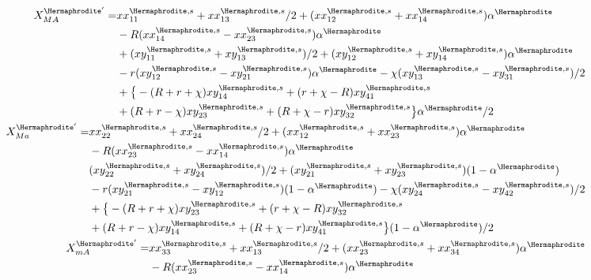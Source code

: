 \documentclass[12pt]{article}
\begin{document}
\begingroup
\allowdisplaybreaks
\begin{subequations}
\begin{align}
%
\begin{split}
X_{MA}^{{\Hermaphrodite}'}=&xx_{11}^{\Hermaphrodite,s}+xx_{13}^{\Hermaphrodite,s}/2+(xx_{12}^{\Hermaphrodite,s}+xx_{14}^{\Hermaphrodite,s})\alpha^\Hermaphrodite\\
&-R(xx_{14}^{\Hermaphrodite,s}-xx_{23}^{\Hermaphrodite,s}) \alpha^\Hermaphrodite\\
&+(xy_{11}^{\Hermaphrodite,s}+xy_{13}^{\Hermaphrodite,s})/2+(xy_{12}^{\Hermaphrodite,s}+xy_{14}^{\Hermaphrodite,s})\alpha^\Hermaphrodite\\
&- r(xy_{12}^{\Hermaphrodite,s}-xy_{21}^{\Hermaphrodite,s})\alpha^\Hermaphrodite - \chi(xy_{13}^{\Hermaphrodite,s}-xy_{31}^{\Hermaphrodite,s})/2\\
&+\big{\{}-(R+r+\chi)xy_{14}^{\Hermaphrodite,s} +(r+\chi-R)xy_{41}^{\Hermaphrodite,s}\\
&+(R+r-\chi) xy_{23}^{\Hermaphrodite,s}+(R+\chi-r)xy_{32}^{\Hermaphrodite,s}\big{\}}\alpha^\Hermaphrodite/2
\end{split}
\\
%
\begin{split}
X_{Ma}^{{\Hermaphrodite}'}=&xx_{22}^{\Hermaphrodite,s}+xx_{24}^{\Hermaphrodite,s}/2+(xx_{12}^{\Hermaphrodite,s}+xx_{23}^{\Hermaphrodite,s})\alpha^\Hermaphrodite\\
&-R(xx_{23}^{\Hermaphrodite,s}-xx_{14}^{\Hermaphrodite,s}) \alpha^\Hermaphrodite\\
&(xy_{22}^{\Hermaphrodite,s}+xy_{24}^{\Hermaphrodite,s})/2+(xy_{21}^{\Hermaphrodite,s}+xy_{23}^{\Hermaphrodite,s})(1-\alpha^\Hermaphrodite)\\
&- r(xy_{21}^{\Hermaphrodite,s}-xy_{12}^{\Hermaphrodite,s})(1-\alpha^\Hermaphrodite) - \chi(xy_{24}^{\Hermaphrodite,s}-xy_{42}^{\Hermaphrodite,s})/2\\
&+\big{\{}-(R+r+\chi)xy_{23}^{\Hermaphrodite,s}+(r+\chi-R)xy_{32}^{\Hermaphrodite,s}\\
&+(R+r-\chi) xy_{14}^{\Hermaphrodite,s}+(R+\chi-r)xy_{41}^{\Hermaphrodite,s}\big{\}}(1-\alpha^\Hermaphrodite)/2
\end{split}
\\
%
\begin{split}
X_{mA}^{{\Hermaphrodite}'}=&xx_{33}^{\Hermaphrodite,s}+xx_{13}^{\Hermaphrodite,s}/2+(xx_{23}^{\Hermaphrodite,s}+xx_{34}^{\Hermaphrodite,s})\alpha^\Hermaphrodite\\
&-R(xx_{23}^{\Hermaphrodite,s}-xx_{14}^{\Hermaphrodite,s}) \alpha^\Hermaphrodite\\

\end{split}
\end{align}
\end{subequations}
\end{document}
